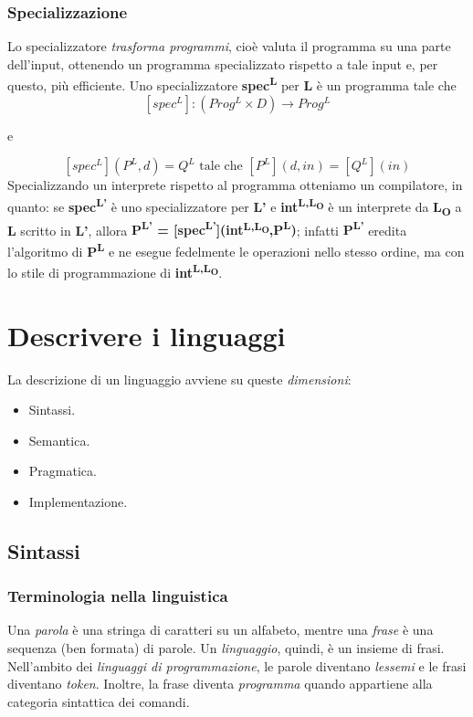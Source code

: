 \documentclass[a4paper,oneside,titlepage]{book}
\begin{document}
\subsection{Specializzazione}
Lo specializzatore \textit{trasforma programmi}, cioè valuta il programma su una parte dell'input, ottenendo un programma specializzato rispetto a tale input e, per questo, più efficiente. Uno specializzatore \textbf{spec\textsuperscript{L}} per \textbf{L} è un programma tale che
\[ [spec^{L}]: (Prog^{L} \times D) \rightarrow Prog^{L} \]
\begin{center}
	e
\end{center}
\[ [spec^{L}](P^{L},d) = Q^{L} \text{ tale che } [P^{L}](d,in) = [Q^{L}](in) \]
Specializzando un interprete rispetto al programma otteniamo un compilatore, in quanto: se \textbf{spec\textsuperscript{L'}} è uno specializzatore per \textbf{L'} e \textbf{int\textsuperscript{L,L\textsubscript{O}}} è un interprete da \textbf{L\textsubscript{O}} a \textbf{L} scritto in \textbf{L'}, allora \textbf{P\textsuperscript{L'} = [spec\textsuperscript{L'}](int\textsuperscript{L,L\textsubscript{O}},P\textsuperscript{L})}; infatti \textbf{P\textsuperscript{L'}} eredita l’algoritmo di \textbf{P\textsuperscript{L}} e ne esegue fedelmente le operazioni nello stesso ordine, ma con lo stile di programmazione di \textbf{int\textsuperscript{L,L\textsubscript{O}}}.


\chapter{Descrivere i linguaggi}
La descrizione di un linguaggio avviene su queste \textit{dimensioni}:
\begin{itemize}
	\item Sintassi.
	\item Semantica.
	\item Pragmatica.
	\item Implementazione.
\end{itemize}

\section{Sintassi}

\subsection{Terminologia nella linguistica}
Una \textit{parola} è una stringa di caratteri su un alfabeto, mentre una \textit{frase} è una sequenza (ben formata) di parole. Un \textit{linguaggio}, quindi, è un insieme di frasi. Nell'ambito dei \textit{linguaggi di programmazione}, le parole diventano \textit{lessemi} e le frasi diventano \textit{token}. Inoltre, la frase diventa \textit{programma} quando appartiene alla categoria sintattica dei comandi.
\end{document}
